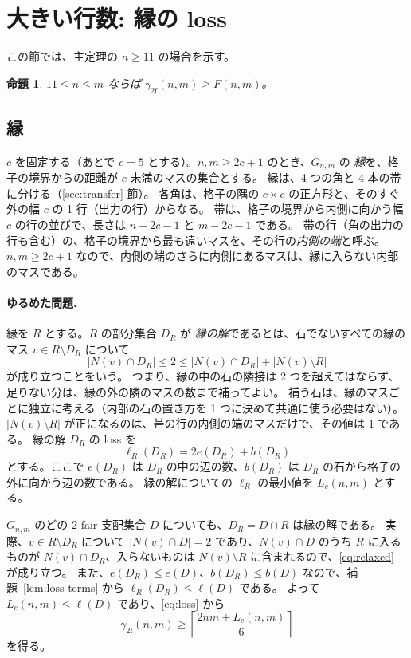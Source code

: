 \documentclass[11pt]{ltjsarticle}
\newtheorem{proposition}[theorem]{命題}
\theoremstyle{definition}
\newcommand{\gf}{\gamma_{2\mathrm{f}}}
\begin{document}
\section{大きい行数: 縁の loss}\label{sec:large}

この節では、主定理の $n\ge 11$ の場合を示す。

\begin{proposition}\label{prop:large}
$11\le n\le m$ ならば $\gf(n,m)\ge F(n,m)$。
\end{proposition}

\subsection{縁}
$c$ を固定する（あとで $c=5$ とする）。$n,m\ge 2c+1$ のとき、$G_{n,m}$ の \emph{縁}を、格子の境界からの距離が $c$ 未満のマスの集合とする。
縁は、4 つの角と 4 本の帯に分ける（\ref{sec:transfer} 節）。
各角は、格子の隅の $c\times c$ の正方形と、そのすぐ外の幅 $c$ の 1 行（出力の行）からなる。
帯は、格子の境界から内側に向かう幅 $c$ の行の並びで、長さは $n-2c-1$ と $m-2c-1$ である。
帯の行（角の出力の行も含む）の、格子の境界から最も遠いマスを、その行の\emph{内側の端}と呼ぶ。
$n,m\ge 2c+1$ なので、内側の端のさらに内側にあるマスは、縁に入らない内部のマスである。

\paragraph{ゆるめた問題.}
縁を $R$ とする。$R$ の部分集合 $D_R$ が \emph{縁の解}であるとは、石でないすべての縁のマス $v\in R\setminus D_R$ について
\begin{equation}\label{eq:relaxed}
|N(v)\cap D_R|\le 2\le |N(v)\cap D_R|+|N(v)\setminus R|
\end{equation}
が成り立つことをいう。
つまり、縁の中の石の隣接は 2 つを超えてはならず、足りない分は、縁の外の隣のマスの数まで補ってよい。
補う石は、縁のマスごとに独立に考える（内部の石の置き方を 1 つに決めて共通に使う必要はない）。
$|N(v)\setminus R|$ が正になるのは、帯の行の内側の端のマスだけで、その値は $1$ である。
縁の解 $D_R$ の loss を
\[
\ell_R(D_R)=2e(D_R)+b(D_R)
\]
とする。ここで $e(D_R)$ は $D_R$ の中の辺の数、$b(D_R)$ は $D_R$ の石から格子の外に向かう辺の数である。
縁の解についての $\ell_R$ の最小値を $L_c(n,m)$ とする。

$G_{n,m}$ のどの 2-fair 支配集合 $D$ についても、$D_R=D\cap R$ は縁の解である。
実際、$v\in R\setminus D_R$ について $|N(v)\cap D|=2$ であり、$N(v)\cap D$ のうち $R$ に入るものが $N(v)\cap D_R$、入らないものは $N(v)\setminus R$ に含まれるので、\eqref{eq:relaxed} が成り立つ。
また、$e(D_R)\le e(D)$、$b(D_R)\le b(D)$ なので、補題~\ref{lem:loss-terms} から $\ell_R(D_R)\le\ell(D)$ である。
よって $L_c(n,m)\le\ell(D)$ であり、\eqref{eq:loss} から
\begin{equation}\label{eq:border}
\gf(n,m)\ge \left\lceil\frac{2nm+L_c(n,m)}{6}\right\rceil
\end{equation}
を得る。
\end{document}
